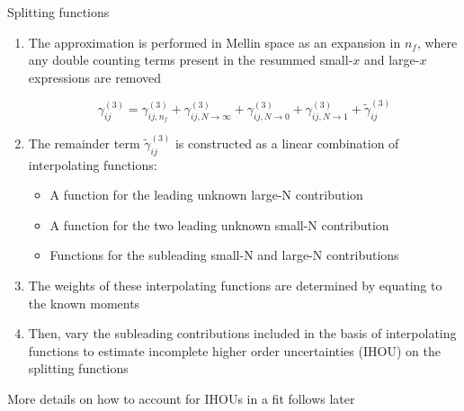 \documentclass[8pt,t]{beamer}
\begin{document}
\begin{frame}{Splitting functions}

  \begin{enumerate}
    \item   The approximation is performed in Mellin space as an expansion in $n_f$, where any double counting terms present in the resummed small-$x$ and large-$x$ expressions are removed

    $$\gamma_{i j}^{(3)}=\gamma_{i j, n_f}^{(3)}+\gamma_{i j, N \rightarrow \infty}^{(3)}+\gamma_{i j, N \rightarrow 0}^{(3)}+\gamma_{i j, N \rightarrow 1}^{(3)}+\widetilde{\gamma}_{i j}^{(3)}$$

    \item   The remainder term $\widetilde{\gamma}_{i j}^{(3)}$ is constructed as a linear combination of interpolating functions:
    \begin{itemize}
      \item A function for the leading unknown large-N contribution
      \item A function for the two leading unknown small-N contribution
      \item Functions for the subleading small-N and large-N contributions
    \end{itemize}

    \item The weights of these interpolating functions are determined by equating to the known moments
    \item Then, vary the subleading contributions included in the basis of interpolating functions to estimate incomplete higher order uncertainties (IHOU) on the splitting functions
  \end{enumerate}

  \vspace*{1em}
  More details on how to account for IHOUs in a fit follows later
\end{frame}
\end{document}
